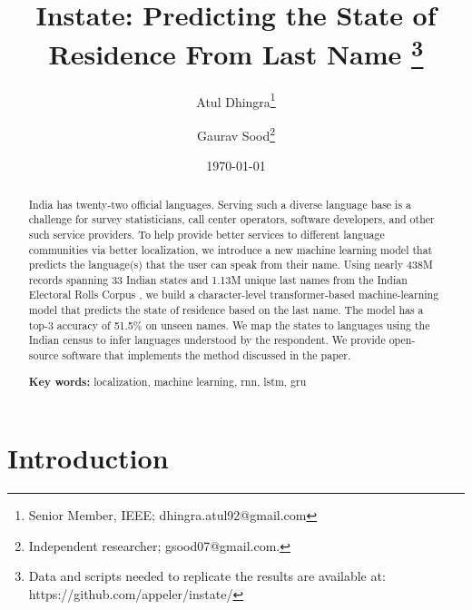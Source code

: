 \documentclass[11pt,  letterpaper]{article}
\title{Instate: Predicting the State of Residence From Last Name
\thanks{Data and scripts needed to replicate the results are available at: https://github.com/appeler/instate/}}
\author{Atul Dhingra\thanks{Senior Member, IEEE; \textsf{dhingra.atul92@gmail.com}} \and Gaurav Sood\thanks{Independent researcher;  \textsf{gsood07@gmail.com}.}}
\date{\today}
\begin{document}
\maketitle

\begin{abstract}

India has twenty-two official languages. Serving such a diverse language base is a challenge for survey statisticians, call center operators, software developers, and other such service providers. To help provide better services to different language communities via better localization, we introduce a new machine learning model that predicts the language(s) that the user can speak from their name. Using nearly 438M records spanning 33 Indian states and 1.13M unique last names from the Indian Electoral Rolls Corpus \citep{DVN/OG47IV_2023}, we build a character-level transformer-based machine-learning model that predicts the state of residence based on the last name. The model has a top-3 accuracy of 51.5\% on unseen names. We map the states to languages using the Indian census to infer languages understood by the respondent. We provide open-source software that implements the method discussed in the paper.

\smallskip

\textbf{Key words:} localization, machine learning, rnn, lstm, gru

\end{abstract}




\section{Introduction}
\end{document}
